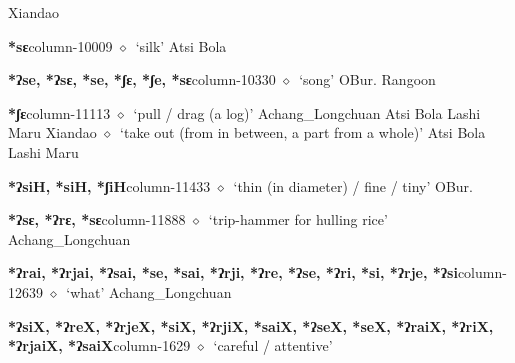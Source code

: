          Xiandao 
  \item {\footnotesize \textbf{*sɛ}}{\tiny column-10009}
         $\diamond$~`silk'
         Atsi 
\hspace{1ex}
         Bola 
  \item {\footnotesize \textbf{*ʔse, *ʔsɛ, *se, *ʃɛ, *ʃe, *sɛ}}{\tiny column-10330}
         $\diamond$~`song'
         OBur. 
\hspace{1ex}
         Rangoon 
  \item {\footnotesize \textbf{*ʃɛ}}{\tiny column-11113}
         $\diamond$~`pull / drag (a log)'
         Achang\_Longchuan 
\hspace{1ex}
         Atsi 
\hspace{1ex}
         Bola 
\hspace{1ex}
         Lashi 
\hspace{1ex}
         Maru 
\hspace{1ex}
         Xiandao 
\hspace{1ex}
         $\diamond$~`take out (from in between, a part from a whole)'
         Atsi 
\hspace{1ex}
         Bola 
\hspace{1ex}
         Lashi 
\hspace{1ex}
         Maru 
  \item {\footnotesize \textbf{*ʔsiH, *siH, *ʃiH}}{\tiny column-11433}
         $\diamond$~`thin (in diameter) / fine / tiny'
         OBur. 
  \item {\footnotesize \textbf{*ʔsɛ, *ʔrɛ, *sɛ}}{\tiny column-11888}
         $\diamond$~`trip-hammer for hulling rice'
         Achang\_Longchuan 
  \item {\footnotesize \textbf{*ʔrai, *ʔrjai, *ʔsai, *se, *sai, *ʔrji, *ʔre, *ʔse, *ʔri, *si, *ʔrje, *ʔsi}}{\tiny column-12639}
         $\diamond$~`what'
         Achang\_Longchuan 
  \item {\footnotesize \textbf{*ʔsiX, *ʔreX, *ʔrjeX, *siX, *ʔrjiX, *saiX, *ʔseX, *seX, *ʔraiX, *ʔriX, *ʔrjaiX, *ʔsaiX}}{\tiny column-1629}
         $\diamond$~`careful / attentive'
